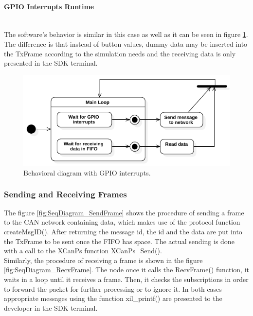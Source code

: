 \paragraph{GPIO Interrupts Runtime}~\\
The software's behavior is similar in this case as well as it can be seen in figure \ref{fig:StateDiagram_CANSoft_GPIOIntr}.
The difference is that instead of button values, dummy data may be inserted into the TxFrame according to the simulation needs and the receiving data is only presented in the SDK terminal.
\begin{figure}[h!]
	\centering
	\includegraphics[width = 0.85\linewidth]{graphics/StateDiagram_CANSoft_GPIOIntr.pdf}
	\caption{Behavioral diagram with GPIO interrupts.}
	\label{fig:StateDiagram_CANSoft_GPIOIntr}
\end{figure}

\subsubsection{Sending and Receiving Frames}
The figure \ref{fig:SeqDiagram_SendFrame} shows the procedure of sending a frame to the CAN network containing data, which makes use of the protocol function createMsgID().
After returning the message id, the id and the data are put into the TxFrame to be sent once the FIFO has space.
The actual sending is done with a call to the XCanPs function XCanPs\_Send().
\\
Similarly, the procedure of receiving a frame is shown in the figure \ref{fig:SeqDiagram_RecvFrame}.
The node once it calls the RecvFrame() function, it waits in a loop until it receives a frame.
Then, it checks the subscriptions in order to forward the packet for further processing or to ignore it.
In both cases appropriate messages using the function xil\_printf() are presented to the developer in the SDK terminal.

